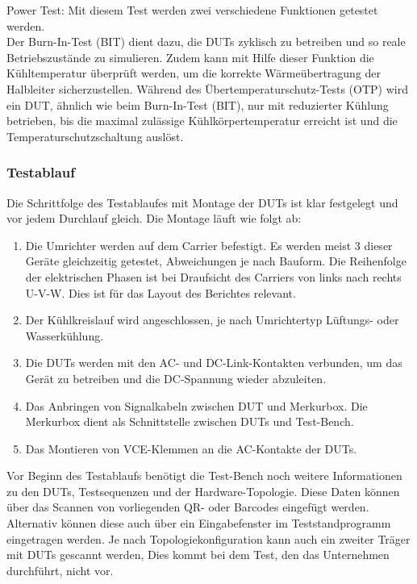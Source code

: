 Power Test:
Mit diesem Test werden zwei verschiedene Funktionen getestet werden. \\
Der Burn-In-Test (BIT) dient dazu, die \ac{DUTs} zyklisch zu betreiben und so reale Betriebszustände zu simulieren.
Zudem kann mit Hilfe dieser Funktion die Kühltemperatur überprüft werden, um die korrekte Wärmeübertragung der Halbleiter sicherzustellen.
Während des Übertemperaturschutz-Tests (OTP) wird ein DUT, ähnlich wie beim Burn-In-Test (BIT), nur mit reduzierter Kühlung betrieben, bis die maximal zulässige Kühlkörpertemperatur erreicht ist und die Temperaturschutzschaltung auslöst. \cite*{Main_Manuel_USTB2018}
\subsubsection{Testablauf}
Die Schrittfolge des Testablaufes mit Montage der \ac{DUTs} ist klar festgelegt und vor jedem Durchlauf gleich.
Die Montage läuft wie folgt ab:
\begin{enumerate}

\item Die Umrichter werden auf dem Carrier befestigt. Es werden meist 3 dieser Geräte gleichzeitig getestet, Abweichungen je nach Bauform.
Die Reihenfolge der elektrischen Phasen ist bei Draufsicht des Carriers von links nach rechts U-V-W. Dies ist für das Layout des Berichtes relevant.
\item Der Kühlkreislauf wird angeschlossen, je nach Umrichtertyp Lüftungs- oder Wasserkühlung.
\item Die \ac{DUTs} werden mit den AC- und DC-Link-Kontakten verbunden, um das Gerät zu betreiben und die DC-Spannung wieder abzuleiten.
\item Das Anbringen von Signalkabeln zwischen DUT und Merkurbox. Die Merkurbox dient als Schnittstelle zwischen \ac{DUTs} und Test-Bench.
\item Das Montieren von VCE-Klemmen an die AC-Kontakte der \ac{DUTs}.

\end{enumerate}

Vor Beginn des Testablaufs benötigt die Test-Bench noch weitere Informationen zu den \ac{DUTs}, Testsequenzen und der Hardware-Topologie.
Diese Daten können über das Scannen von vorliegenden QR- oder Barcodes eingefügt werden.
Alternativ können diese auch über ein Eingabefenster im Teststandprogramm eingetragen werden.
Je nach Topologiekonfiguration kann auch ein zweiter Träger mit \ac{DUTs} gescannt werden,
Dies kommt bei dem Test, den das Unternehmen durchführt, nicht vor. \cite*{Main_Manuel_USTB2018}

